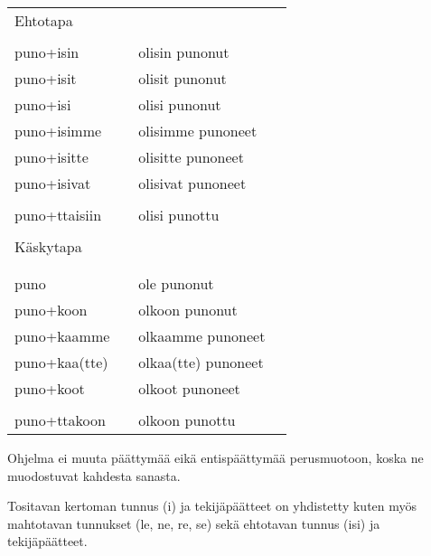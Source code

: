 \begin{tabular}{@{}|l|l|l|l|}
Ehtotapa      &            &                   & \\
              &            &                   & \\ \hline
puno+isin     &            & olisin punonut    & \\
puno+isit     &            & olisit punonut    & \\
puno+isi      &            & olisi punonut     & \\
puno+isimme   &            & olisimme punoneet & \\
puno+isitte   &            & olisitte punoneet & \\
puno+isivat   &            & olisivat punoneet & \\ 
              &            &                   & \\
puno+ttaisiin &            & olisi punottu     & \\ \hline
              &            &                   & \\
Käskytapa     &            &                   & \\
              &            &                   & \\ \hline
              &            &                   & \\
puno          &            & ole punonut       & \\
puno+koon     &            & olkoon punonut    & \\
puno+kaamme   &            & olkaamme punoneet & \\
puno+kaa(tte) &            & olkaa(tte) punoneet & \\
puno+koot     &            & olkoot punoneet   & \\ 
              &            &                   & \\
puno+ttakoon  &            & olkoon punottu    & \\ \hline
\end{tabular}

\bigskip

Ohjelma ei muuta päättymää eikä entispäättymää perusmuotoon, koska ne
muodostuvat kahdesta sanasta.


Tositavan kertoman tunnus (i) ja tekijäpäätteet on yhdistetty kuten
myös mahtotavan tunnukset (le, ne, re, se) sekä ehtotavan tunnus (isi)
ja tekijäpäätteet.

\clearpage


